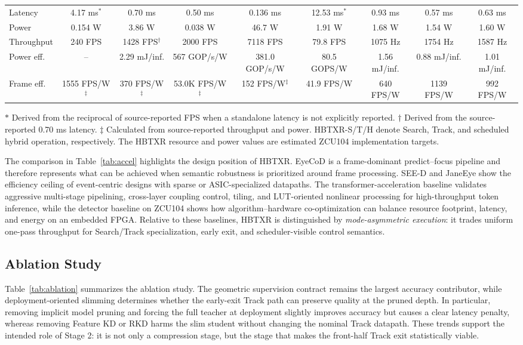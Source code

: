 \documentclass[journal]{IEEEtran}
\begin{document}
\begin{table}[t]
{\begin{tabular}{@{}lcccccccc@{}}
Latency & 4.17 ms$^\ast$ & 0.70 ms & 0.50 ms & 0.136 ms & 12.53 ms$^\ast$ & 0.93 ms & 0.57 ms & 0.63 ms \\
Power & 0.154 W & 3.86 W & 0.038 W & 46.7 W & 1.91 W & 1.68 W & 1.54 W & 1.60 W \\
Throughput & 240 FPS & 1428 FPS$^\dagger$ & 2000 FPS & 7118 FPS & 79.8 FPS & 1075 Hz & 1754 Hz & 1587 Hz \\
Power eff. & -- & 2.29 mJ/inf. & 567 GOP/s/W & 381.0 GOP/s/W & 80.5 GOPS/W & 1.56 mJ/inf. & 0.88 mJ/inf. & 1.01 mJ/inf. \\
Frame eff. & 1555 FPS/W$^\ddagger$ & 370 FPS/W$^\ddagger$ & 53.0K FPS/W$^\ddagger$ & 152 FPS/W$^\ddagger$ & 41.9 FPS/W & 640 FPS/W & 1139 FPS/W & 992 FPS/W \\
\bottomrule
\end{tabular}}
\vspace{1mm}
\parbox{\textwidth}{\footnotesize $\ast$ Derived from the reciprocal of source-reported FPS when a standalone latency is not explicitly reported. $\dagger$ Derived from the source-reported 0.70 ms latency. $\ddagger$ Calculated from source-reported throughput and power. HBTXR-S/T/H denote Search, Track, and scheduled hybrid operation, respectively. The HBTXR resource and power values are estimated ZCU104 implementation targets.}
\end{table}

The comparison in Table~\ref{tab:accel} highlights the design position of HBTXR. EyeCoD is a frame-dominant predict--focus pipeline and therefore represents what can be achieved when semantic robustness is prioritized around frame processing. SEE-D and JaneEye show the efficiency ceiling of event-centric designs with sparse or ASIC-specialized datapaths. The transformer-acceleration baseline validates aggressive multi-stage pipelining, cross-layer coupling control, tiling, and LUT-oriented nonlinear processing for high-throughput token inference, while the detector baseline on ZCU104 shows how algorithm--hardware co-optimization can balance resource footprint, latency, and energy on an embedded FPGA. Relative to these baselines, HBTXR is distinguished by \emph{mode-asymmetric execution}: it trades uniform one-pass throughput for Search/Track specialization, early exit, and scheduler-visible control semantics.

\subsection{Ablation Study}
Table~\ref{tab:ablation} summarizes the ablation study. The geometric supervision contract remains the largest accuracy contributor, while deployment-oriented slimming determines whether the early-exit Track path can preserve quality at the pruned depth. In particular, removing implicit model pruning and forcing the full teacher at deployment slightly improves accuracy but causes a clear latency penalty, whereas removing Feature KD or RKD harms the slim student without changing the nominal Track datapath. These trends support the intended role of Stage 2: it is not only a compression stage, but the stage that makes the front-half Track exit statistically viable.
\end{document}
